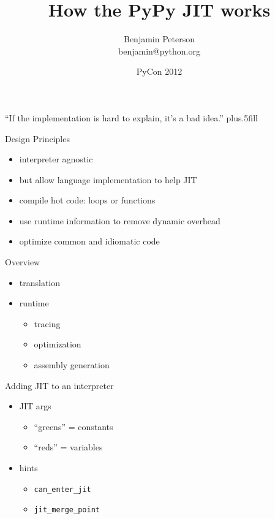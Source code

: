 \documentclass[14pt]{beamer}
\title{How the PyPy JIT works}
\author{Benjamin Peterson \\ benjamin@python.org}
\date{PyCon 2012}
\begin{document}
\begin{frame}
  \titlepage
\end{frame}



\begin{frame}

  ``If the implementation is hard to explain, it's a bad idea.''
  \vskip0pt plus.5fill
\end{frame}

\begin{frame}{Design Principles}
\begin{itemize}
\item interpreter agnostic
\item but allow language implementation to help JIT
\item compile hot code: loops or functions
\item use runtime information to remove dynamic overhead
\item optimize common and idiomatic code
\end{itemize}
\end{frame}

\begin{frame}{Overview}
\begin{itemize}
\item translation
\item runtime
\begin{itemize}
\item tracing
\item optimization
\item assembly generation
\end{itemize}
\end{itemize}
\end{frame}

\begin{frame}[fragile]{Adding JIT to an interpreter}
\begin{itemize}
\item JIT args
\begin{itemize}
\item ``greens'' = constants
\item ``reds'' = variables
\end{itemize}
\item hints
\begin{itemize}
\item \verb+can_enter_jit+
\item \verb+jit_merge_point+
\end{itemize}
\end{itemize}
\end{frame}
\end{document}
